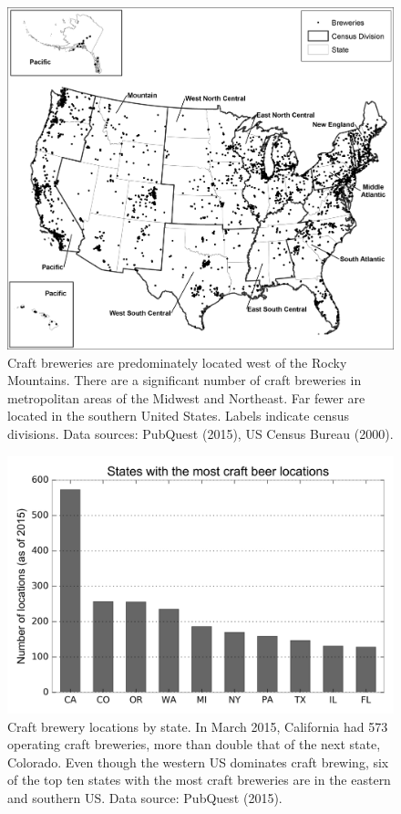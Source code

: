\documentclass[]{article}
\begin{document}
\begin{figure}
	\centering
		\includegraphics[width=0.95\linewidth]{media/fig01.png}
	\caption{Craft breweries are predominately located west of the Rocky
Mountains. There are a significant number of craft breweries in
metropolitan areas of the Midwest and Northeast. Far fewer are located
in the southern United States. Labels indicate census divisions. Data
sources: PubQuest (2015), US Census Bureau (2000).}
	\label{fig:usa}
\end{figure} 

\begin{figure}
	\centering
		\includegraphics[width=0.95\linewidth]{media/fig02.png}
	\caption{Craft brewery locations by state. In March 2015, California had 573
operating craft breweries, more than double that of the next state,
Colorado. Even though the western US dominates craft brewing, six of the
top ten states with the most craft breweries are in the eastern and
southern US. Data source: PubQuest (2015).}
	\label{fig:breweries}
\end{figure}
\end{document}
